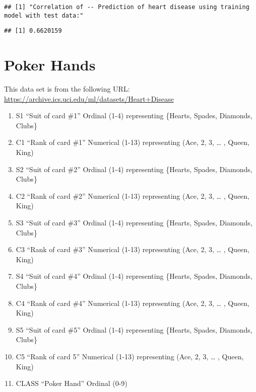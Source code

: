 \documentclass[]{article}
\newenvironment{Shaded}{\begin{snugshade}}{\end{snugshade}}
\newcommand{\KeywordTok}[1]{\textcolor[rgb]{0.13,0.29,0.53}{\textbf{#1}}}
\newcommand{\OperatorTok}[1]{\textcolor[rgb]{0.81,0.36,0.00}{\textbf{#1}}}
\newcommand{\NormalTok}[1]{#1}
\begin{document}
\begin{verbatim}
## [1] "Correlation of -- Prediction of heart disease using training model with test data:"
\end{verbatim}

\begin{Shaded}
\end{Shaded}

\begin{verbatim}
## [1] 0.6620159
\end{verbatim}

\section{Poker Hands}\label{poker-hands}

This data set is from the following URL:
\url{https://archive.ics.uci.edu/ml/datasets/Heart+Disease}

\begin{enumerate}
\def\labelenumi{\arabic{enumi})}
\item
  S1 ``Suit of card \#1'' Ordinal (1-4) representing \{Hearts, Spades,
  Diamonds, Clubs\}
\item
  C1 ``Rank of card \#1'' Numerical (1-13) representing (Ace, 2, 3,
  \ldots{} , Queen, King)
\item
  S2 ``Suit of card \#2'' Ordinal (1-4) representing \{Hearts, Spades,
  Diamonds, Clubs\}
\item
  C2 ``Rank of card \#2'' Numerical (1-13) representing (Ace, 2, 3,
  \ldots{} , Queen, King)
\item
  S3 ``Suit of card \#3'' Ordinal (1-4) representing \{Hearts, Spades,
  Diamonds, Clubs\}
\item
  C3 ``Rank of card \#3'' Numerical (1-13) representing (Ace, 2, 3,
  \ldots{} , Queen, King)
\item
  S4 ``Suit of card \#4'' Ordinal (1-4) representing \{Hearts, Spades,
  Diamonds, Clubs\}
\item
  C4 ``Rank of card \#4'' Numerical (1-13) representing (Ace, 2, 3,
  \ldots{} , Queen, King)
\item
  S5 ``Suit of card \#5'' Ordinal (1-4) representing \{Hearts, Spades,
  Diamonds, Clubs\}
\item
  C5 ``Rank of card 5'' Numerical (1-13) representing (Ace, 2, 3,
  \ldots{} , Queen, King)
\item
  CLASS ``Poker Hand'' Ordinal (0-9)
\end{enumerate}
\end{document}
